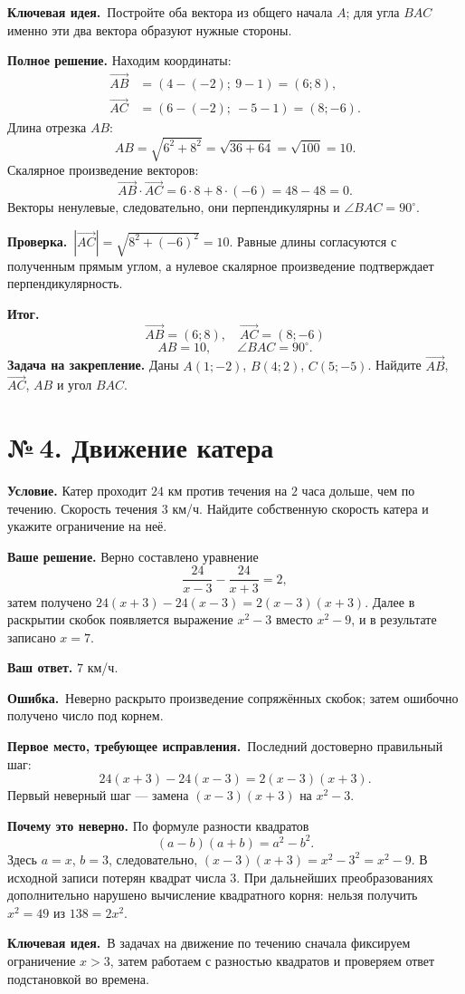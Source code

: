 \documentclass[a4paper,12pt]{article}
\newcommand{\errlabel}{\textcolor{err}{\textbf{Ошибка.}}}
\newcommand{\keylabel}{\textcolor{accent}{\textbf{Ключевая идея.}}}
\newcommand{\resultlabel}{\textcolor{accent}{\textbf{Итог.}}}
\newcommand{\reviewtask}[2]{\clearpage\phantomsection\label{task:#1}\section*{\textcolor{accent}{№\,#1. #2}}}
\newcommand{\firstwrong}{\textbf{Первое место, требующее исправления.}}
\newcommand{\verify}{\textbf{Проверка.}}
\newcommand{\practice}{\medskip\textbf{Задача на закрепление.} }
\begin{document}
\keylabel\ Постройте оба вектора из общего начала $A$; для угла $BAC$ именно эти два вектора образуют нужные стороны.

\textbf{Полное решение.} Находим координаты:
\begin{align*}
\overrightarrow{AB}&=(4-(-2);\ 9-1)=(6;8),\\
\overrightarrow{AC}&=(6-(-2);\ -5-1)=(8;-6).
\end{align*}
Длина отрезка $AB$:
\[
AB=\sqrt{6^2+8^2}=\sqrt{36+64}=\sqrt{100}=10.
\]
Скалярное произведение векторов:
\[
\overrightarrow{AB}\cdot\overrightarrow{AC}
=6\cdot8+8\cdot(-6)=48-48=0.
\]
Векторы ненулевые, следовательно, они перпендикулярны и $\angle BAC=90^\circ$.

\verify\ $|\overrightarrow{AC}|=\sqrt{8^2+(-6)^2}=10$. Равные длины согласуются с полученным прямым углом, а нулевое скалярное произведение подтверждает перпендикулярность.

\resultlabel
\[\boxed{\overrightarrow{AB}=(6;8),\quad\overrightarrow{AC}=(8;-6)}\]
\[\boxed{AB=10,\qquad\angle BAC=90^\circ}.\]
\practice Даны $A(1;-2)$, $B(4;2)$, $C(5;-5)$. Найдите $\overrightarrow{AB}$, $\overrightarrow{AC}$, $AB$ и угол $BAC$.

\reviewtask{4}{Движение катера}
\textbf{Условие.} Катер проходит $24$ км против течения на $2$ часа дольше, чем по течению. Скорость течения $3$ км/ч. Найдите собственную скорость катера и укажите ограничение на неё.

\textbf{Ваше решение.} Верно составлено уравнение
\[
\frac{24}{x-3}-\frac{24}{x+3}=2,
\]
затем получено $24(x+3)-24(x-3)=2(x-3)(x+3)$. Далее в раскрытии скобок появляется выражение $x^2-3$ вместо $x^2-9$, и в результате записано $x=7$.

\textbf{Ваш ответ.} $7$ км/ч.

\errlabel\ Неверно раскрыто произведение сопряжённых скобок; затем ошибочно получено число под корнем.

\firstwrong\ Последний достоверно правильный шаг:
\[
24(x+3)-24(x-3)=2(x-3)(x+3).
\]
Первый неверный шаг --- замена $(x-3)(x+3)$ на $x^2-3$.

\textbf{Почему это неверно.} По формуле разности квадратов
\[
(a-b)(a+b)=a^2-b^2.
\]
Здесь $a=x$, $b=3$, следовательно, $(x-3)(x+3)=x^2-3^2=x^2-9$. В исходной записи потерян квадрат числа $3$. При дальнейших преобразованиях дополнительно нарушено вычисление квадратного корня: нельзя получить $x^2=49$ из $138=2x^2$.

\keylabel\ В задачах на движение по течению сначала фиксируем ограничение $x>3$, затем работаем с разностью квадратов и проверяем ответ подстановкой во времена.
\end{document}
